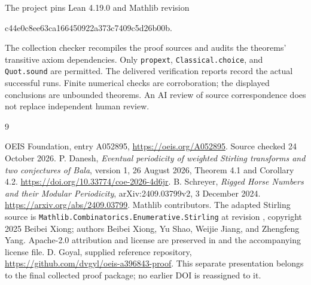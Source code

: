 \documentclass[11pt,a4paper]{article}
\theoremstyle{remark}
\begin{document}
The project pins Lean 4.19.0 and Mathlib revision
\begin{center}\small\ttfamily
c44e0c8ee63ca166450922a373c7409c5d26b00b.
\end{center}
The collection checker recompiles the proof sources and audits the
theorems' transitive axiom dependencies. Only \texttt{propext},
\texttt{Classical.choice}, and \texttt{Quot.sound} are permitted.
The delivered verification reports record the actual successful runs.
Finite numerical checks are corroboration; the displayed conclusions are
unbounded theorems. An AI review of source correspondence does not replace
independent human review.
\begin{thebibliography}{9}
\raggedright
{} OEIS Foundation, entry A052895,
\url{https://oeis.org/A052895}. Source checked 24 October 2026.
 P. Danesh, \emph{Eventual periodicity of weighted
Stirling transforms and two conjectures of Bala}, version 1,
26 August 2026, Theorem 4.1 and Corollary 4.2.
\url{https://doi.org/10.33774/coe-2026-4d6jr}.
 B. Schreyer, \emph{Rigged Horse Numbers and their
Modular Periodicity}, arXiv:2409.03799v2, 3 December 2024.
\url{https://arxiv.org/abs/2409.03799}.
 Mathlib contributors. The adapted Stirling source is
\texttt{Mathlib.Combinatorics.Enumerative.Stirling} at revision
, copyright 2025 Beibei Xiong;
authors Beibei Xiong, Yu Shao, Weijie Jiang, and Zhengfeng Yang.
Apache-2.0 attribution and license are preserved in
 and the accompanying license file.
 D. Goyal, supplied reference repository,
\url{https://github.com/dvgyl/oeis-a396843-proof}.
This separate presentation belongs to the final collected proof package;
no earlier DOI is reassigned to it.
\end{thebibliography}
\end{document}
